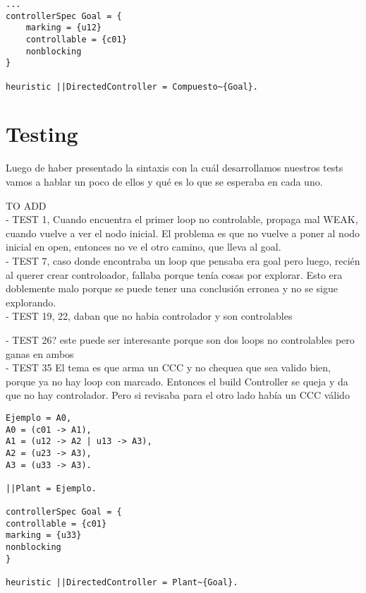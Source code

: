 \begin{lstlisting}[language = mtsa, caption=Ejemplo de Controller y DCS, label=ejController]
...
controllerSpec Goal = {
    marking = {u12}
    controllable = {c01}
    nonblocking
}

heuristic ||DirectedController = Compuesto~{Goal}.
\end{lstlisting}


\section{Testing}
Luego de haber presentado la sintaxis con la cuál desarrollamos nuestros tests vamos a hablar un poco de ellos y qué es lo que se esperaba en cada uno. 


TO ADD\\


- TEST 1, Cuando encuentra el primer loop no controlable, propaga mal WEAK, cuando vuelve a ver el nodo inicial. El problema es que no vuelve a poner al nodo inicial en open, entonces no ve el otro camino, que lleva al goal.\\

- TEST 7, caso donde encontraba un loop que pensaba era goal pero luego, recién al querer crear controloador, fallaba porque tenía cosas por explorar. Esto era doblemente malo porque se puede tener una conclusión erronea y no se sigue explorando.\\

- TEST 19, 22, daban que no habia controlador y son controlables

- TEST 26? este puede ser interesante porque son dos loops no controlables pero ganas en ambos\\

- TEST 35 El tema es que arma un CCC y no chequea que sea valido bien, porque ya no hay loop con marcado. Entonces el build Controller se queja y da que no hay controlador. Pero si revisaba para el otro lado había un CCC válido

\begin{lstlisting}[language = mtsa, caption=Ejemplo de test]
Ejemplo = A0,
A0 = (c01 -> A1),
A1 = (u12 -> A2 | u13 -> A3),
A2 = (u23 -> A3),
A3 = (u33 -> A3).

||Plant = Ejemplo.

controllerSpec Goal = {
controllable = {c01}
marking = {u33}
nonblocking
}

heuristic ||DirectedController = Plant~{Goal}.
\end{lstlisting}
